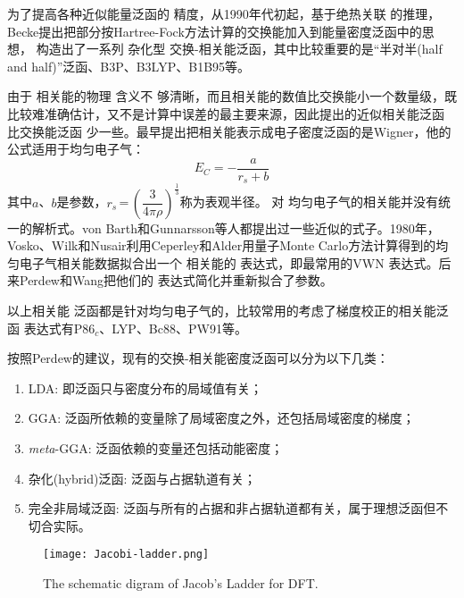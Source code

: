 为了提高各种近似{能量}泛函的%
精度，从1990年代初起，基于绝热关联%
{的推理}，Becke提出把部分按Hartree-Fock方法计算的交换能加入到能量密度泛函中的思想{，}%
构造出了一系列%
杂化型%
交换-相关{能}泛函，其中比较重要的是“半对半(half and half)”泛函\cite{JCP98-1372_1993}、B3P\cite{JCP98-5648_1993}、B3LYP\cite{JPC98-11623_1994}、B1B95\cite{JCP104-1040_1995}等。

由于%
相关能的物理%
{含}义不%
{够}清晰，而且相关能的数值比交换能小一个数量级，既比较难准确估计，又不是计算中误差的最主要来源，因此提出的{近似}相关能泛函%
比交换能泛函%
少一些。最早提出把相关能表示成电子密度泛函的是Wigner\cite{PR46-1002_1934}，他的公式适用于均匀电子气：
\begin{equation}
  E_C=-\dfrac a{r_s+b}
  \label{eq:dft-16}
\end{equation}
其中$a$、$b$是参数，$r_s$\,=\,$\left(\dfrac3{4\pi\rho}\right)^{\frac13}$称为表观半径。%
对%
均匀电子气的相关能并没有统一\linebreak 的解析式。von Barth\cite{JPC5-1629_1972}和Gunnarsson\cite{PRB13-4274_1976}等人都提出过一些近似的式子。1980年，\linebreak Vosko、Wilk和Nusair\cite{CJP58-1200_1980}利用Ceperley和Alder\cite{PRL45-566_1980}用量子Monte Carlo方法计算得到的{均匀电子气}相关能数据拟合出一个%
相关能的%
{表达}式，即最常用的VWN%
{表达}式。后来Perdew和Wang\cite{PRB45-13244_1992}把他们的%
{表达}式简化并重新拟合了参数。

以上相关能%
{泛函}都是针对均匀电子气的，比较常用的考虑了梯度校正的相关能泛函%
{表达}式有P86$_c$\cite{PRB33-8822_1986}、LYP\cite{PRB37-785_1988}、Bc88\cite{JCP88-1053_1988}、PW91\cite{PRB46-6671_1992,PRB48-4978_1993,PRB54-16533_1996,PRB57-14999_1998}等。

按照Perdew的建议\cite{Perdew-Schmidt}，现有的交换-相关能密度泛函可以分为以下几类：
\begin{enumerate}
  \item LDA: 即泛函只与密度分布的局域值有关；
  \item GGA: 泛函所依赖的变量除了局域密度之外，还包括局域密度的梯度；
  \item \textit{meta}-GGA: 泛函依赖的变量还包括动能密度；
  \item {杂化(hybrid)泛函}: 泛函与占据轨道有关；
  \item 完全非局域泛函: 泛函与所有的占据和非占据轨道都有关，属于理想泛函但不%
{切合实际}。
\end{enumerate}
\begin{figure}[!h]
\centering
\texttt{[image: Jacobi-ladder.png]}
\caption{\small The schematic digram of Jacob's Ladder for DFT.\cite{Perdew-Schmit_2001,Science298-759_2002}}
\label{Fig:Jacob-Ladder}
\end{figure}

